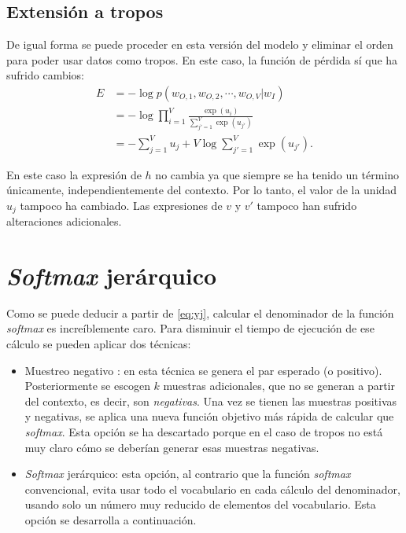 \subsection{Extensión a tropos}

De igual forma se puede proceder en esta versión del modelo y eliminar el orden para poder usar datos como tropos. En este caso, la función de pérdida
sí que ha sufrido cambios:
\begin{align}
  E & = - \log p\left( w_{O,1}, w_{O,2}, \cdots, w_{O,V} | w_I \right) \\
    & = - \log \prod_{i=1}^V \frac{\exp(u_i)}{\sum_{j'=1}^V\exp(u_{j'})} \\
    & = - \sum_{j=1}^V u_{j} + V\log \sum_{j'=1}^V\exp(u_{j'}).
\end{align}

En este caso la expresión de $h$ no cambia ya que siempre se ha tenido un término únicamente, independientemente del contexto. Por lo
tanto, el valor de la unidad $u_{j}$ tampoco ha cambiado. Las expresiones de $v$ y $v'$ tampoco han sufrido alteraciones adicionales.

\section{\textit{Softmax} jerárquico}

Como se puede deducir a partir de \ref{eq:yj}, calcular el denominador de la función \textit{softmax} es increíblemente caro. Para disminuir el tiempo de ejecución de ese cálculo
se pueden aplicar dos técnicas:

\begin{itemize}
  \item Muestreo negativo \cite{goldberg2014word2vec}: en esta técnica se genera el par esperado (o positivo). Posteriormente se escogen $k$ muestras adicionales, que no se generan a partir del contexto, es decir, son \textit{negativas}.
  Una vez se tienen las muestras positivas y negativas, se aplica una nueva función objetivo más rápida de calcular que \textit{softmax}. Esta opción se ha descartado porque en el caso de tropos no
  está muy claro cómo se deberían generar esas muestras negativas.
  \item \textit{Softmax} jerárquico: esta opción, al contrario que la función \textit{softmax} convencional, evita usar todo el vocabulario en cada cálculo del denominador, usando solo un número muy reducido de elementos del vocabulario. Esta opción se desarrolla a continuación.
\end{itemize}

